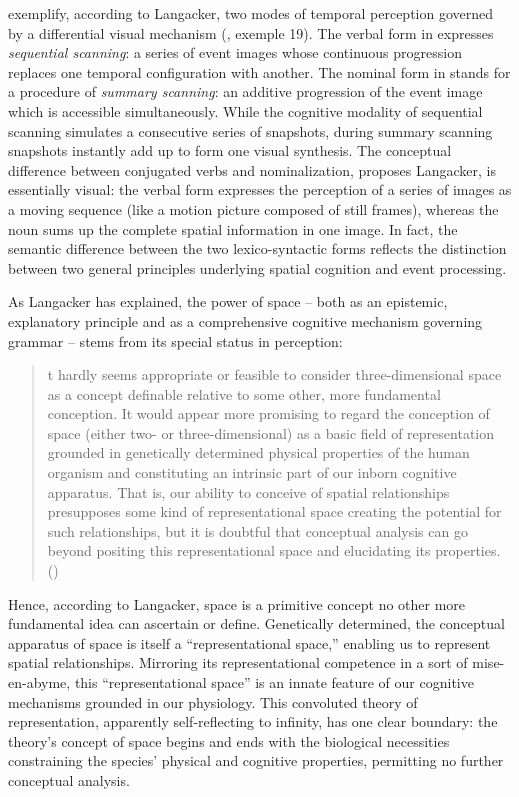 \documentclass[output=paper]{langsci/langscibook}
\begin{document}
exemplify, according to Langacker, two modes of temporal perception governed by a differential visual mechanism (\citeyear[146]{langacker_foundations_1987}, exemple 19). The verbal form in  expresses \textit{sequential scanning}: a series of event images whose continuous progression replaces one temporal configuration with another. The nominal form in  stands for a procedure of \textit{summary scanning}: an additive progression of the event image which is accessible simultaneously. While the cognitive modality of sequential scanning simulates a consecutive series of snapshots, during summary scanning snapshots instantly add up to form one visual synthesis. The conceptual difference between conjugated verbs and nominalization, proposes Langacker, is essentially visual: the verbal form expresses the perception of a series of images as a moving sequence (like a motion picture composed of still frames), whereas the noun sums up the complete spatial information in one image. In fact, the semantic difference between the two lexico-syntactic forms reflects the distinction between two general principles underlying spatial cognition and event processing.

As Langacker has explained, the power of space -- both as an epistemic, explanatory principle and as a comprehensive cognitive mechanism governing grammar -- stems from its special status in perception:

\begin{quote}\relax
[I]t hardly seems appropriate or feasible to consider three-dimensional space as a concept definable relative to some other, more fundamental conception. It would appear more promising to regard the conception of space (either two- or three-dimensional) as a basic field of representation grounded in genetically determined physical properties of the human organism and constituting an intrinsic part of our inborn cognitive apparatus. That is, our ability to conceive of spatial relationships presupposes some kind of representational space creating the potential for such relationships, but it is doubtful that conceptual analysis can go beyond positing this representational space and elucidating its properties. (\citealt [148] {langacker_foundations_1987})
\end{quote}

Hence, according to Langacker, space is a primitive concept no other more fundamental idea can ascertain or define. Genetically determined, the conceptual apparatus of space is itself a “representational space,” enabling us to represent spatial relationships. Mirroring its representational competence in a sort of mise-en-abyme, this “representational space” is an innate feature of our cognitive mechanisms grounded in our physiology. This convoluted theory of representation, apparently self-reflecting to infinity, has one clear boundary: the theory’s concept of space begins and ends with the biological necessities constraining the species’ physical and cognitive properties, permitting no further conceptual analysis. 
\end{document}
